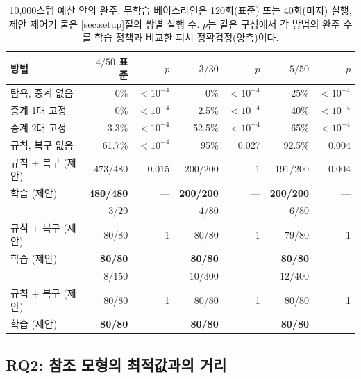 \documentclass[final,5p,times,twocolumn]{elsarticle}
\begin{document}
\begin{table}[t]
\centering
\caption{10{,}000스텝 예산 안의 완주. 무학습 베이스라인은 120회(표준) 또는 40회(미지) 실행, 제안
제어기 둘은 \ref{sec:setup}절의 쌍별 실행 수. $p$는 같은 구성에서 각 방법의 완주 수를 학습 정책과
비교한 피셔 정확검정(양측)이다.}
\label{tab:completion}
\scriptsize
\setlength{\tabcolsep}{2.2pt}
\begin{tabular}{lrrrrrr}
\toprule
방법 & $4/50$ 표준 & $p$ & $3/30$ & $p$ & $5/50$ & $p$ \\
\midrule
탐욕, 중계 없음 & 0\% & $<10^{-4}$ & 0\% & $<10^{-4}$ & 25\% & $<10^{-4}$ \\
중계 1대 고정 & 0\% & $<10^{-4}$ & 2.5\% & $<10^{-4}$ & 40\% & $<10^{-4}$ \\
중계 2대 고정 & 3.3\% & $<10^{-4}$ & 52.5\% & $<10^{-4}$ & 65\% & $<10^{-4}$ \\
규칙, 복구 없음 & 61.7\% & $<10^{-4}$ & 95\% & 0.027 & 92.5\% & 0.004 \\
규칙 + 복구 (제안) & 473/480 & 0.015 & 200/200 & 1 & 191/200 & 0.004 \\
학습 (제안) & \textbf{480/480} & --- & \textbf{200/200} & --- & \textbf{200/200} & --- \\
\midrule
 & $3/20$ & & $4/80$ & & $6/80$ & \\
규칙 + 복구 (제안) & 80/80 & 1 & 80/80 & 1 & 79/80 & 1 \\
학습 (제안) & \textbf{80/80} & & \textbf{80/80} & & \textbf{80/80} & \\
\midrule
 & $8/150$ & & $10/300$ & & $12/400$ & \\
규칙 + 복구 (제안) & 80/80 & 1 & 80/80 & 1 & 80/80 & 1 \\
학습 (제안) & \textbf{80/80} & & \textbf{80/80} & & \textbf{80/80} & \\
\bottomrule
\end{tabular}
\end{table}

\subsection{RQ2: 참조 모형의 최적값과의 거리}
\label{sec:rq2}
\end{document}
